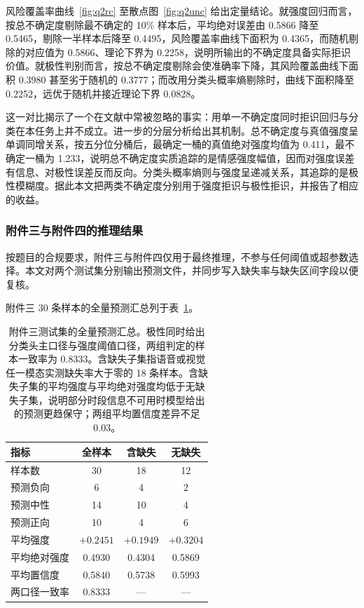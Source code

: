 \documentclass[withoutpreface,bwprint]{cumcmthesis}
\begin{document}
风险覆盖率曲线~\ref{fig:q2rc} 至散点图~\ref{fig:q2unc} 给出定量结论。就强度回归而言，按总不确定度剔除最不确定的 10\% 样本后，平均绝对误差由 0.5866 降至 0.5465，剔除一半样本后降至 0.4495，风险覆盖率曲线下面积为 0.4365，而随机剔除的对应值为 0.5866、理论下界为 0.2258，说明所输出的不确定度具备实际拒识价值。就极性判别而言，按总不确定度剔除会使准确率下降，其风险覆盖曲线下面积 0.3980 甚至劣于随机的 0.3777；而改用分类头概率熵剔除时，曲线下面积降至 0.2252，远优于随机并接近理论下界 0.0828。

这一对比揭示了一个在文献中常被忽略的事实：用单一不确定度同时拒识回归与分类在本任务上并不成立。进一步的分层分析给出其机制。总不确定度与真值强度呈单调同增关系，按五分位分桶后，最确定一桶的真值绝对强度均值为 0.411，最不确定一桶为 1.233，说明总不确定度实质追踪的是情感强度幅值，因而对强度误差有信息、对极性误差反而反向。分类头概率熵则与强度呈递减关系，其追踪的是极性模糊度。据此本文把两类不确定度分别用于强度拒识与极性拒识，并报告了相应的收益。

\subsubsection{附件三与附件四的推理结果}

按题目的合规要求，附件三与附件四仅用于最终推理，不参与任何阈值或超参数选择。本文对两个测试集分别输出预测文件，并同步写入缺失率与缺失区间字段以便复核。

附件三 30 条样本的全量预测汇总列于表~\ref{tab:q2att3}。

\begin{table}[H]
\centering
  \caption{附件三测试集的全量预测汇总。极性同时给出分类头主口径与强度阈值口径，两组判定的样本一致率为 0.8333。含缺失子集指语音或视觉任一模态实测缺失率大于零的 18 条样本。含缺失子集的平均强度与平均绝对强度均低于无缺失子集，说明部分时段信息不可用时模型给出的预测更趋保守；两组平均置信度差异不足 0.03。}
\label{tab:q2att3}
\begin{tabular}{lccc}
\toprule
指标 & 全样本 & 含缺失 & 无缺失 \\
\midrule
样本数 & 30 & 18 & 12 \\
预测负向 & 6 & 4 & 2 \\
预测中性 & 14 & 10 & 4 \\
预测正向 & 10 & 4 & 6 \\
平均强度 & $+0.2451$ & $+0.1949$ & $+0.3204$ \\
平均绝对强度 & 0.4930 & 0.4304 & 0.5869 \\
平均置信度 & 0.5840 & 0.5738 & 0.5993 \\
两口径一致率 & 0.8333 & --- & --- \\
\bottomrule
\end{tabular}
\end{table}
\end{document}
